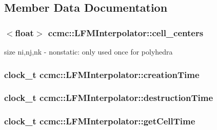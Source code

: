\subsection{Member Data Documentation}
\hypertarget{classccmc_1_1_l_f_m_interpolator_a1765ca6f750c97c3592ef885ef04e029}{
\subsubsection[{cell\-\_\-centers}]{$<$float$>$ ccmc\-::\-L\-F\-M\-Interpolator\-::cell\-\_\-centers}}\label{classccmc_1_1_l_f_m_interpolator_a1765ca6f750c97c3592ef885ef04e029}
size ni,nj,nk -\/ nonstatic\-: only used once for polyhedra \hypertarget{classccmc_1_1_l_f_m_interpolator_aa885a2e4ded490e33fbc610310f066d8}{
\subsubsection[{creation\-Time}]{\setlength{\rightskip}{0pt plus 5cm}clock\-\_\-t ccmc\-::\-L\-F\-M\-Interpolator\-::creation\-Time}}\label{classccmc_1_1_l_f_m_interpolator_aa885a2e4ded490e33fbc610310f066d8}
\hypertarget{classccmc_1_1_l_f_m_interpolator_a8c53a39101dcc800176cac6aba5ea6bb}{
\subsubsection[{destruction\-Time}]{\setlength{\rightskip}{0pt plus 5cm}clock\-\_\-t ccmc\-::\-L\-F\-M\-Interpolator\-::destruction\-Time}}\label{classccmc_1_1_l_f_m_interpolator_a8c53a39101dcc800176cac6aba5ea6bb}
\hypertarget{classccmc_1_1_l_f_m_interpolator_ac1bf4dd18c18f18347c21673be51ad5d}{
\subsubsection[{get\-Cell\-Time}]{\setlength{\rightskip}{0pt plus 5cm}clock\-\_\-t ccmc\-::\-L\-F\-M\-Interpolator\-::get\-Cell\-Time}}\label{classccmc_1_1_l_f_m_interpolator_ac1bf4dd18c18f18347c21673be51ad5d}
